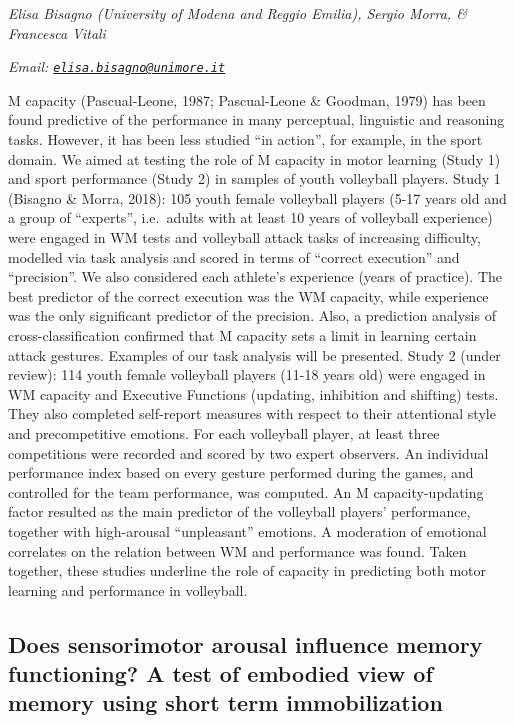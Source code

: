 \documentclass[
  12pt,
]{book}
\begin{document}
\emph{Elisa Bisagno (University of Modena and Reggio Emilia), Sergio Morra, \& Francesca Vitali}

\emph{Email: \href{mailto:elisa.bisagno@unimore.it}{\nolinkurl{elisa.bisagno@unimore.it}}}

M capacity (Pascual-Leone, 1987; Pascual-Leone \& Goodman, 1979) has been found predictive of the performance in many perceptual, linguistic and reasoning tasks. However, it has been less studied ``in action'', for example, in the sport domain. We aimed at testing the role of M capacity in motor learning (Study 1) and sport performance (Study 2) in samples of youth volleyball players. Study 1 (Bisagno \& Morra, 2018): 105 youth female volleyball players (5-17 years old and a group of ``experts'', i.e.~adults with at least 10 years of volleyball experience) were engaged in WM tests and volleyball attack tasks of increasing difficulty, modelled via task analysis and scored in terms of ``correct execution'' and ``precision''. We also considered each athlete's experience (years of practice). The best predictor of the correct execution was the WM capacity, while experience was the only significant predictor of the precision. Also, a prediction analysis of cross-classification confirmed that M capacity sets a limit in learning certain attack gestures. Examples of our task analysis will be presented. Study 2 (under review): 114 youth female volleyball players (11-18 years old) were engaged in WM capacity and Executive Functions (updating, inhibition and shifting) tests. They also completed self-report measures with respect to their attentional style and precompetitive emotions. For each volleyball player, at least three competitions were recorded and scored by two expert observers. An individual performance index based on every gesture performed during the games, and controlled for the team performance, was computed. An M capacity-updating factor resulted as the main predictor of the volleyball players' performance, together with high-arousal ``unpleasant'' emotions. A moderation of emotional correlates on the relation between WM and performance was found. Taken together, these studies underline the role of capacity in predicting both motor learning and performance in volleyball.

\hypertarget{does-sensorimotor-arousal-influence-memory-functioning-a-test-of-embodied-view-of-memory-using-short-term-immobilization}{%
\subsection{Does sensorimotor arousal influence memory functioning? A test of embodied view of memory using short term immobilization}\label{does-sensorimotor-arousal-influence-memory-functioning-a-test-of-embodied-view-of-memory-using-short-term-immobilization}}
\end{document}
